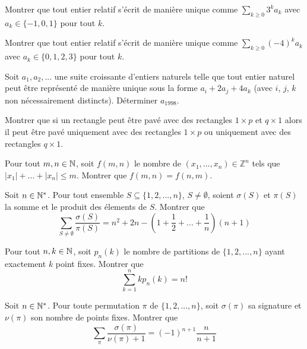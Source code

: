 \begin{exo}
Montrer que tout entier relatif s'écrit de manière unique comme $\sum_{k\geq 0}3^ka_k$ avec $a_k\in\{-1,0,1\}$ pour tout $k$.
\end{exo}


\begin{exo}
Montrer que tout entier relatif s'écrit de manière unique comme $\sum_{k\geq 0}(-4)^ka_k$ avec $a_k\in\{0,1,2,3\}$ pour tout $k$.
\end{exo}


\begin{exo}
Soit $a_1,a_2,...$ une suite croissante d'entiers naturels telle que tout entier naturel peut être représenté de manière unique sous la
forme $a_i +2a_j +4a_k$ (avec $i$, $j$, $k$ non nécessairement distincts). Déterminer $a_{1998}$.
\end{exo}


\begin{exo}
Montrer que si un rectangle peut être pavé avec des rectangles $1\times p$ et $q\times 1$ alors il peut être pavé uniquement avec des rectangles $1\times p$ ou uniquement avec des rectangles $q\times 1$.
\end{exo}


\begin{exo}
Pour tout $m,n\in\mathbb N$, soit $f(m,n)$ le nombre de $(x_1,...,x_n)\in\mathbb{Z}^n$ tels que $|x_1|+...+|x_n|\leq m$. Montrer que $f(m,n)=f(n,m)$.
\end{exo}


\begin{exo}
Soit $n\in\mathbb N^*$. Pour tout ensemble $S\subseteq \{1,2,...,n\}$, $S\neq\emptyset$, soient $\sigma(S)$ et $\pi(S)$ la somme et le produit des élements de $S$. Montrer que
$$\sum_{S\neq\emptyset}\frac{\sigma(S)}{\pi(S)}=n^2+2n-(1+\frac{1}{2}+...+\frac{1}{n})(n+1)$$
\end{exo}


\begin{exo}
Pour tout $n,k\in\mathbb N$, soit $p_n(k)$ le nombre de partitions de $\{1,2,...,n\}$ ayant exactement $k$ point fixes. Montrer que
$$\sum_{k=1}^n kp_n(k)=n!$$
\end{exo}


\begin{exo}
Soit $n\in\mathbb N^*$. Pour toute permutation $\pi$ de $\{1,2,...,n\}$, soit $\sigma(\pi)$ sa signature et $\nu(\pi)$ son nombre de points fixes. Montrer que
$$\sum_{\pi}\frac{\sigma(\pi)}{\nu(\pi)+1}=(-1)^{n+1}\frac{n}{n+1}$$
\end{exo}